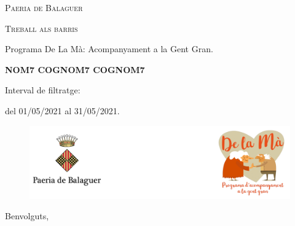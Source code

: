 \documentclass[a4paper,12pt]{elsarticle}  %
\begin{document}
 	


\begin{titlepage}
	\centering

	{\scshape\LARGE Paeria de Balaguer \par}


			\vfill


	{\scshape\Large Treball als barris\par}

	
			\vspace{0.5cm}

	
	{\Large Programa De La Mà: Acompanyament a la Gent Gran.\par}

			

			\vfill



	{\Large\bfseries NOM7 COGNOM7 COGNOM7 \par}
	


			\vfill



	{\large Interval de filtratge:\par}
	{\large del 01/05/2021 al 31/05/2021.\par}
		

\end{titlepage}



\clearpage







\FloatBarrier
\begin{figure}[h]
	\centering	
	\includegraphics[width=1\textwidth]{../IMATGES/logoPaeriaMa.png}
\end{figure}
\FloatBarrier	

\vfill









\noindent Benvolguts,

	\vspace{0.5cm}
\end{document}

